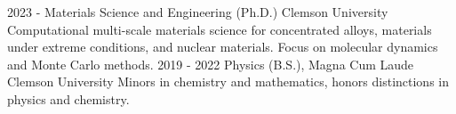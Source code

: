 \documentclass[9pt]{developercv} %
\begin{document}
\vspace{-10 pt}
\begin{entrylist}
    \entry
		{2023 - }
		{Materials Science and Engineering (Ph.D.)}
		{Clemson University}
		{Computational multi-scale materials science for concentrated alloys, materials under extreme conditions, and nuclear materials. Focus on molecular dynamics and Monte Carlo methods.}
    \entry
		{2019 - 2022}
		{Physics (B.S.), Magna Cum Laude}
		{Clemson University}
		{Minors in chemistry and mathematics, honors distinctions in physics and chemistry.}
\end{entrylist}
\end{document}
